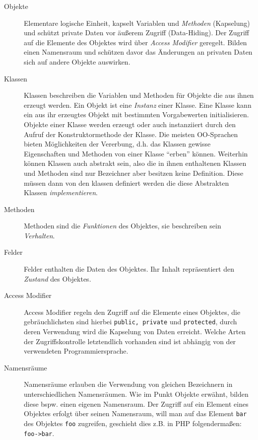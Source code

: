 \begin{description}
    \item[Objekte] 
        Elementare logische Einheit, kapselt Variablen und \emph{Methoden} (Kapselung) und schützt private Daten vor äußerem Zugriff (Data-Hiding). Der Zugriff auf die Elemente des Objektes wird über \emph{Access Modifier} geregelt. Bilden einen Namensraum und schützen davor das Änderungen an privaten Daten sich auf andere Objekte auswirken.
    \item[Klassen] 
        Klassen beschreiben die Variablen und Methoden für Objekte die aus ihnen erzeugt werden. Ein Objekt ist eine \emph{Instanz} einer Klasse. Eine Klasse kann ein aus ihr erzeugtes Objekt mit bestimmten Vorgabewerten initialisieren. Objekte einer Klasse werden erzeugt oder auch instanziiert durch den Aufruf der Konstruktormethode der Klasse.
        Die meisten OO-Sprachen bieten Möglichkeiten der Vererbung, d.h. das Klassen gewisse Eigenschaften und Methoden von einer Klasse \enquote{erben} können. Weiterhin können Klassen auch abstrakt sein, also die in ihnen enthaltenen Klassen und Methoden sind nur Bezeichner aber besitzen keine Definition. Diese müssen dann von den klassen definiert werden die diese Abstrakten Klassen \emph{implementieren}.
    \item[Methoden]
        Methoden sind die \emph{Funktionen} des Objektes, sie beschreiben sein \emph{Verhalten}.
    \item[Felder]
        Felder enthalten die Daten des Objektes. Ihr Inhalt repräsentiert den \emph{Zustand} des Objektes.
    \item[Access Modifier]    
        Access Modifier regeln den Zugriff auf die Elemente eines Objektes, die gebräuchlichsten sind hierbei \texttt{public, private} und \texttt{protected}, durch deren Verwendung wird die Kapselung von Daten erreicht. Welche Arten der Zugriffskontrolle letztendlich vorhanden sind ist abhängig von der verwendeten Programmiersprache.
    \item[Namensräume]
        Namensräume erlauben die Verwendung von gleichen Bezeichnern in unterschiedlichen Namensräumen. Wie im Punkt Objekte erwähnt, bilden diese bspw. einen eigenen Namensraum. Der Zugriff auf ein Element eines Objektes erfolgt über seinen Namensraum, will man auf das Element \texttt{bar} des Objektes \texttt{foo} zugreifen, geschieht dies z.B. in PHP folgendermaßen: \texttt{foo->bar}.
\end{description}


